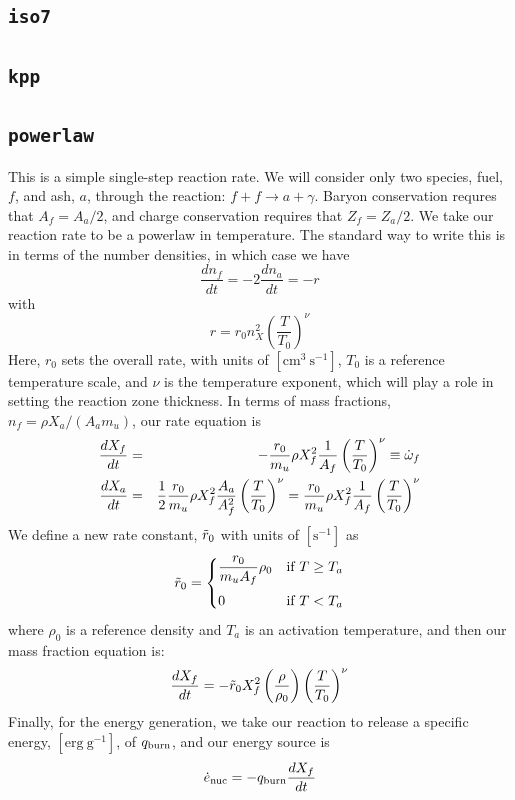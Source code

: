 \subsection{{\tt iso7}}


\subsection{{\tt kpp}}


\subsection{{\tt powerlaw}}

This is a simple single-step reaction rate.
We will consider only two species, fuel, $f$, and ash, $a$, through
the reaction: $f + f \rightarrow a + \gamma$.  Baryon conservation
requres that $A_f = A_a/2$, and charge conservation requires that $Z_f
= Z_a/2$.  We take
our reaction rate to be a powerlaw in temperature.  The standard way
to write this is in terms of the number densities, in which case we
have
\begin{equation}
\frac{d n_f}{d t} = -2\frac{d n_a}{d t} = -r
\end{equation}
with
\begin{equation}
  r = r_0 n_X^2 \left( \frac{T}{T_0} \right )^\nu
\end{equation}
Here, $r_0$ sets the overall rate, with units of
$[\mathrm{cm^3~s^{-1}}]$, $T_0$ is a reference temperature scale, and
$\nu$ is the temperature exponent, which will play a role in setting
the reaction zone thickness.  In terms of mass fractions, $n_f = \rho
X_a / (A_a m_u)$, our rate equation is
\begin{eqnarray}
 \frac{dX_f}{dt} &=& - \frac{r_0}{m_u} \rho X_f^2 \frac{1}{A_f} \left (\frac{T}{T_0}\right)^\nu \equiv \dot\omega_f \label{eq:Xf} \\
 \frac{dX_a}{dt} &=& \frac{1}{2}\frac{r_0}{m_u} \rho X_f^2 \frac{A_a}{A_f^2} \left (\frac{T}{T_0}\right)^\nu = \frac{r_0}{m_u} \rho X_f^2 \frac{1}{A_f} \left (\frac{T}{T_0}\right)^\nu  \label{eq:Xa}
\end{eqnarray}
We define a new rate constant, $\tilde{r}_0$ with units of $[\mathrm{s^{-1}}]$ as
\begin{equation}
\tilde{r}_0 =  \begin{cases}
  \dfrac{r_0}{m_u A_f} \rho_0 & \text{if $T \ge T_a$} \\[1em]
  0                          & \text{if $T < T_a$}
 \end{cases}
\end{equation}
where $\rho_0$ is a reference density and $T_a$ is an activation
temperature, and then our mass fraction equation is:
\begin{equation}
\frac{dX_f}{dt} = -\tilde{r}_0 X_f^2 \left (\frac{\rho}{\rho_0} \right ) \left ( \frac{T}{T_0}\right )^\nu
\end{equation}
Finally, for the
energy generation, we take our reaction to release a specific energy,
$[\mathrm{erg~g^{-1}}]$, of $q_\mathrm{burn}$, and our energy source is
\begin{equation}
{{\dot{e}_\mathrm{nuc}}} = -q_\mathrm{burn} \frac{dX_f}{dt}
\end{equation}

